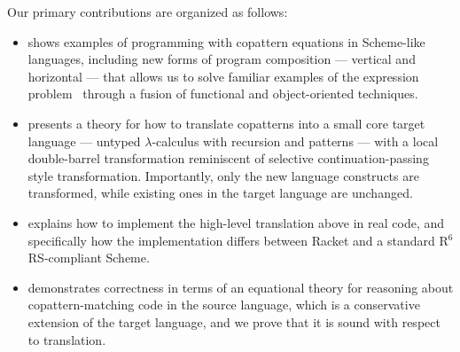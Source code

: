 Our primary contributions are organized as follows:
\begin{itemize}
\item {} shows examples of programming with copattern equations in Scheme-like languages, including new forms of program composition --- vertical and horizontal --- that allows us to solve familiar examples of the expression problem~\cite{ExpressionProblem} through a fusion of functional and object-oriented techniques.
\item {} presents a theory for how to translate copatterns into a small core target language --- untyped $\lambda$-calculus with recursion and patterns --- with a local double-barrel transformation reminiscent of selective continuation-passing style transformation.
  Importantly, only the new language constructs are transformed, while existing ones in the target language are unchanged.
\item {} explains how to implement the high-level translation above in real code, and specifically how the implementation differs between Racket and a standard R${}^6$RS-compliant Scheme.
\item {} demonstrates correctness in terms of an equational theory for reasoning about copattern-matching code in the source language, which is a conservative extension of the target language, and we prove that it is sound with respect to translation.
\end{itemize} 


